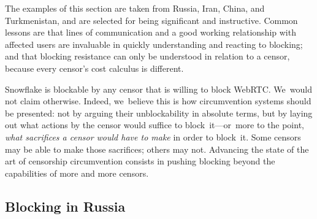\documentclass[letterpaper,twocolumn]{article}
\begin{document}
The examples of this section are taken from
Russia, Iran, China, and Turkmenistan,
and are selected for being significant and instructive.
Common lessons are that lines of communication
and a good working relationship
with affected users are invaluable in quickly understanding and reacting to blocking;
and that blocking resistance
can only be understood in relation to a censor,
because every censor's cost calculus is different.

Snowflake is blockable by any censor that is willing to block WebRTC.
We~would not claim otherwise.
Indeed, we~believe this is how circumvention systems
should be presented:
not by arguing their unblockability in absolute terms,
but by laying out
what actions by the censor would suffice to block~it---or~more
to the point,
\emph{what sacrifices a censor would have to make}
in order to block~it.
Some censors may be able to make those sacrifices; others may not.
Advancing the state of the art of censorship circumvention
consists in pushing blocking
beyond the capabilities of more and more censors.

\subsection{Blocking in Russia}
\label{sec:block-ru}
\end{document}
